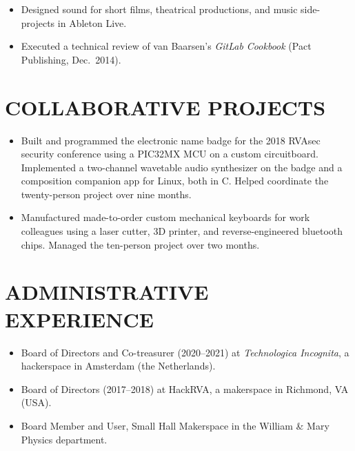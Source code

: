\documentclass{res}     %
\begin{document}
\begin{resume}
\begin{itemize}[leftmargin=5mm]
\item Designed sound for short films, theatrical productions, and music side-projects in Ableton Live.
\item Executed a technical review of van Baarsen's \emph{GitLab Cookbook} (Pact Publishing, Dec.\ 2014).
\end{itemize}

\section{COLLABORATIVE PROJECTS}
\vspace{5mm}
\begin{itemize}[leftmargin=5mm]
\item Built and programmed the electronic name badge for the 2018 RVAsec security conference using a PIC32MX MCU on a custom circuitboard. Implemented a two-channel wavetable audio synthesizer on the badge and a composition companion app for Linux, both in C. Helped coordinate the twenty-person project over nine months.
\item Manufactured made-to-order custom mechanical keyboards for work colleagues using a laser cutter, 3D printer, and reverse-engineered bluetooth chips. Managed the ten-person project over two months.
\end{itemize}

\section{ADMINISTRATIVE EXPERIENCE}
\vspace{5mm}
\begin{itemize}[leftmargin=5mm]
\item Board of Directors and Co-treasurer (2020--2021) at \emph{Technologica Incognita}, a hackerspace in Amsterdam (the Netherlands).
\item Board of Directors (2017--2018) at HackRVA, a makerspace in Richmond, VA (USA).
\item Board Member and User, Small Hall Makerspace in the William \& Mary Physics department.
\end{itemize}

\end{resume}
\end{document}
